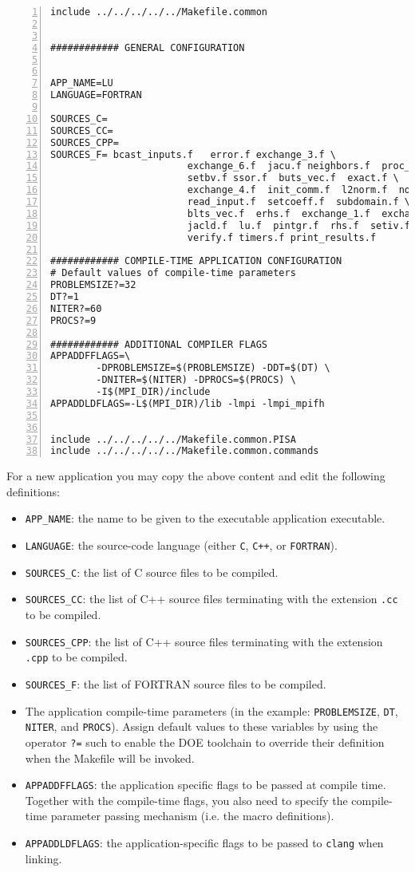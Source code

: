 \documentclass[a4paper, 10pt]{article}
\begin{document}
\begin{Verbatim}[obeytabs, tabsize=4, frame=lines, numbers=left]
include ../../../../../Makefile.common


############ GENERAL CONFIGURATION


APP_NAME=LU
LANGUAGE=FORTRAN

SOURCES_C=
SOURCES_CC=
SOURCES_CPP=
SOURCES_F= bcast_inputs.f   error.f exchange_3.f \
						exchange_6.f  jacu.f neighbors.f  proc_grid.f \
						setbv.f ssor.f  buts_vec.f  exact.f \
						exchange_4.f  init_comm.f  l2norm.f  nodedim.f \
						read_input.f  setcoeff.f  subdomain.f \
						blts_vec.f  erhs.f  exchange_1.f  exchange_5.f \
						jacld.f  lu.f  pintgr.f  rhs.f  setiv.f  \
						verify.f timers.f print_results.f

############ COMPILE-TIME APPLICATION CONFIGURATION
# Default values of compile-time parameters
PROBLEMSIZE?=32
DT?=1
NITER?=60
PROCS?=9

############ ADDITIONAL COMPILER FLAGS
APPADDFFLAGS=\
		-DPROBLEMSIZE=$(PROBLEMSIZE) -DDT=$(DT) \
		-DNITER=$(NITER) -DPROCS=$(PROCS) \
		-I$(MPI_DIR)/include
APPADDLDFLAGS=-L$(MPI_DIR)/lib -lmpi -lmpi_mpifh


include ../../../../../Makefile.common.PISA
include ../../../../../Makefile.common.commands 
\end{Verbatim}

For a new application you may copy the above content and edit the following definitions:
\begin{itemize}
 \item \verb!APP_NAME!: the name to be given to the executable application executable.
 \item \verb!LANGUAGE!: the source-code language (either \verb!C!, \verb!C++!, or \verb!FORTRAN!).
 \item \verb!SOURCES_C!: the list of C source files to be compiled.
 \item \verb!SOURCES_CC!: the list of C++ source files terminating with the extension \verb!.cc! to be compiled.
 \item \verb!SOURCES_CPP!: the list of C++ source files terminating with the extension \verb!.cpp! to be compiled.
 \item \verb!SOURCES_F!: the list of FORTRAN source files to be compiled.
 \item The application compile-time parameters (in the example: \verb!PROBLEMSIZE!, \verb!DT!, \verb!NITER!, and \verb!PROCS!).
	Assign default values to these variables by using the operator \verb!?=! such to enable the DOE toolchain to override their definition
	when the Makefile will be invoked.
 \item \verb!APPADDFFLAGS!: the application specific flags to be passed at compile time. Together with the compile-time flags, you also need to
				specify the compile-time parameter passing mechanism (i.e. the macro definitions).
 \item \verb!APPADDLDFLAGS!: the application-specific flags to be passed to \verb!clang! when linking.
\end{itemize}
\end{document}
